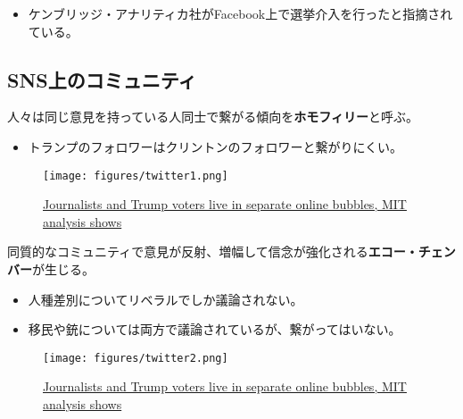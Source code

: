 \documentclass[
  xelatex,
  ja=standard]{bxjsarticle}
\providecommand{\tightlist}{%
  \setlength{\itemsep}{0pt}\setlength{\parskip}{0pt}}\usepackage{longtable,booktabs,array}
\begin{document}
\begin{itemize}
\tightlist
\item
  ケンブリッジ・アナリティカ社がFacebook上で選挙介入を行ったと指摘されている。
\end{itemize}

\hypertarget{snsux4e0aux306eux30b3ux30dfux30e5ux30cbux30c6ux30a3}{%
\subsection{SNS上のコミュニティ}\label{snsux4e0aux306eux30b3ux30dfux30e5ux30cbux30c6ux30a3}}

人々は同じ意見を持っている人同士で繋がる傾向を\textbf{ホモフィリー}と呼ぶ。

\begin{itemize}
\tightlist
\item
  トランプのフォロワーはクリントンのフォロワーと繋がりにくい。
\end{itemize}

\begin{figure}[htpb]

{\centering \texttt{[image: figures/twitter1.png]}

}

\caption{\href{https://www.vice.com/en/article/d3xamx/journalists-and-trump-voters-live-in-separate-online-bubbles-mit-analysis-shows}{Journalists
and Trump voters live in separate online bubbles, MIT analysis shows}}

\end{figure}

同質的なコミュニティで意見が反射、増幅して信念が強化される\textbf{エコー・チェンバー}が生じる。

\begin{itemize}
\tightlist
\item
  人種差別についてリベラルでしか議論されない。
\item
  移民や銃については両方で議論されているが、繋がってはいない。
\end{itemize}

\begin{figure}[htpb]

{\centering \texttt{[image: figures/twitter2.png]}

}

\caption{\href{https://www.vice.com/en/article/d3xamx/journalists-and-trump-voters-live-in-separate-online-bubbles-mit-analysis-shows}{Journalists
and Trump voters live in separate online bubbles, MIT analysis shows}}

\end{figure}
\end{document}
